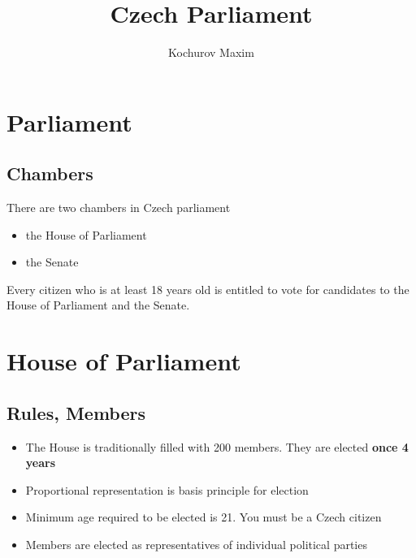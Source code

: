 \documentclass{beamer}
\author{Kochurov Maxim}
\title{Czech Parliament
}
\institute{MSU}
\begin{document}
\begin{frame}
	\maketitle
\end{frame}
\section{Parliament}
\subsection{Chambers}
\begin{frame}
	There are two chambers in Czech parliament
	\begin{itemize}
		\item the House of Parliament
		\item the Senate
	\end{itemize}
Every citizen who is at least 18 years old is entitled to vote for candidates to the House of Parliament and the Senate.
\end{frame}
\section{House of Parliament}
\subsection{Rules, Members}
\begin{frame}
	\begin{itemize}
		\item The House is traditionally filled with 200 members. They are elected \textbf{once 4 years}
		\item Proportional representation is basis principle for election
		\item Minimum age required to be elected is 21. You must be a Czech citizen
		\item Members are elected as representatives of individual political parties
	\end{itemize} 
\end{frame}
\end{document}
